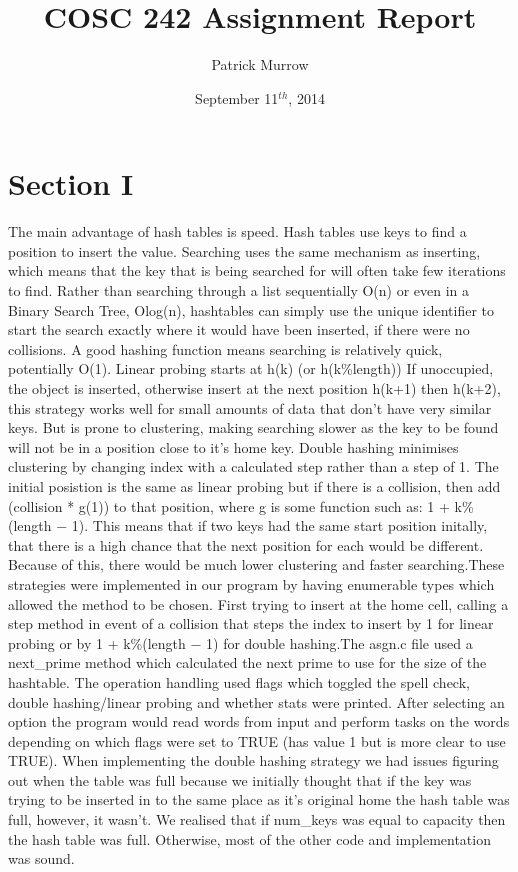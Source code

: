 \documentclass[12pt]{article} %
\title{COSC 242 Assignment Report}
\author{Patrick Murrow}
\date{September 11$^{th}$, 2014}
\begin{document}

\maketitle

\begin{center}
\end{center}
\vspace{-2cm}
\section{Section I}

The main advantage of hash tables is speed. Hash tables use keys to find
a position to insert the value. Searching uses the same mechanism as
inserting, which means that the key that is being searched for will often
take few iterations to find. Rather than searching through a list sequentially
O(n) or even in a Binary Search Tree, Olog(n), hashtables can simply
use the unique identifier to start the search exactly where it would
have been inserted, if there were no collisions. A good hashing
function means searching is relatively quick, potentially O(1). Linear probing starts at h(k)
(or h(k\%length)) If unoccupied, the object is inserted, otherwise
insert at the next position h(k+1) then h(k+2), this strategy works
well for small amounts of data that don’t have very similar keys. But is prone to clustering, making searching slower as the key to be found will not
be in a position close to it’s home key. Double hashing minimises clustering
by changing index with a calculated step rather than a step of 1. The initial
posistion is the same as linear probing but if there is a collision, then add
(collision * g(1)) to that position, where g is some function such as:
1 + k\%(length − 1). This means that if two keys had the same start position
initally, that there is a high chance that the next position for each would
be different. Because of
this, there would be much lower clustering and faster searching.These
strategies were implemented in our program by having enumerable types
which allowed the method to be chosen. First trying to insert at the home cell, calling a step method in event of a collision that steps the
index to insert by 1 for linear probing or by 1 + k\%(length − 1) for double
hashing.The asgn.c file used a next\_prime method which calculated the next
prime to use for the size of the hashtable. The operation handling used flags
which toggled the spell check, double hashing/linear probing and whether stats
were printed. After selecting an option the program would read words from
input and perform tasks on the words depending on which flags were set to TRUE
(has value 1 but is more clear to use TRUE). When implementing the double hashing strategy we had issues figuring out when the table was full because we initially thought that if the key was trying to be inserted in to the same place as it's original home the hash table was full, however, it wasn't. We realised that if num\_keys was equal to capacity then the hash table was full. Otherwise, most of the other code and implementation was sound.
\end{document}
